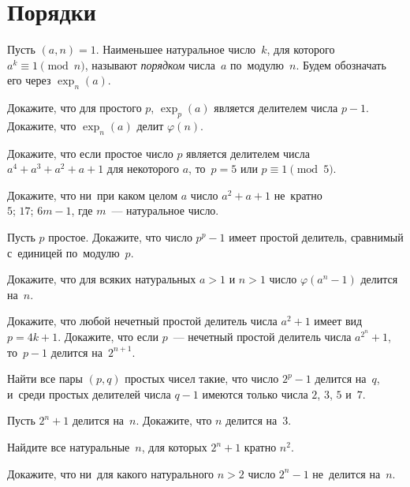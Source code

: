 
\section*{Порядки}

Пусть $(a, n) = 1$.
Наименьшее натуральное число~$k$, для которого $a^k \equiv 1 \pmod n$, называют
\emph{порядком} числа~$a$ по~модулю~$n$.
Будем обозначать его через $\exp_n(a)$.

\begin{problems}

\item
\sp
Докажите, что для простого $p$, $\exp_p(a)$ является делителем
числа $p - 1$.
\\
\sp
Докажите, что $\exp_n(a)$ делит $\varphi(n)$.

\item
Докажите, что если простое число $p$ является делителем числа
$a^4 + a^3 + a^2 + a + 1$ для некоторого $a$, то~$p = 5$ или
$p \equiv 1 \pmod 5$.

\item
Докажите, что ни~при каком целом $a$ число $a^2 + a + 1$ не~кратно
\\
\sp $5$;
\quad
\sp $17$;
\quad
\sp $6m - 1$, где $m$~--- натуральное число.

\item
Пусть $p$ простое.
Докажите, что число $p^p - 1$ имеет простой делитель, сравнимый с~единицей
по~модулю~$p$.

\item
Докажите, что для всяких натуральных $a > 1$ и $n > 1$ число $\varphi(a^n - 1)$
делится на~$n$.

\item
\sp
Докажите, что любой нечетный простой делитель числа $a^2 + 1$ имеет вид
$p = 4k + 1$.
\sp
Докажите, что если $p$~--- нечетный простой делитель числа $a^{2^n} + 1$,
то~$p - 1$ делится на~$2^{n + 1}$.

\item
Найти все пары $(p, q)$ простых чисел такие, что число $2^p - 1$ делится
на~$q$, и~среди простых делителей числа $q - 1$ имеются только числа
$2$, $3$, $5$ и~$7$.

\item
Пусть $2^n + 1$ делится на~$n$.
Докажите, что $n$ делится на~$3$.

\item
Найдите все натуральные~$n$, для которых $2^n + 1$ кратно $n^2$.

\item
Докажите, что ни~для какого натурального $n > 2$ число $2^n - 1$ не~делится
на~$n$.

\end{problems}

